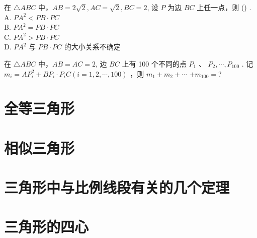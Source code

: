 \documentclass[aspectratio=169]{ctexbeamer}
\theoremstyle{definition}
\begin{document}
\begin{frame}[t]
	\begin{example}
		在 $\triangle A B C$ 中，$A B=2 \sqrt{2}, A C=\sqrt{2}, B C=2$, 设 $P$ 为边 $B C$ 上任一点，则 (\quad) . \\
		A. $P A^{2}<P B \cdot P C$\\
		B. $P A^{2}=P B \cdot P C$\\
		C. $P A^{2}>P B \cdot P C$\\
		D. $P A^{2}$ 与 $P B \cdot P C$ 的大小关系不确定\\
	\end{example}
\end{frame}

\begin{frame}[t]
	\begin{example}
		在 $\triangle A B C$ 中，$A B=A C=2$, 边 $B C$ 上有 100 个不同的点 $P_{1}$ 、 $P_{2}, \cdots, P_{100}$ . 记 $m_{i}=A P_{i}^{2}+B P_{i} \cdot P_{i} C(i=1,2, \cdots, 100)$ ，则 $m_{1}+m_{2}+\cdots$ $+m_{100}=$?\\
	\end{example}
\end{frame}


\section{全等三角形}
\section{相似三角形}
\section{三角形中与比例线段有关的几个定理}
\section{三角形的四心}
\end{document}
